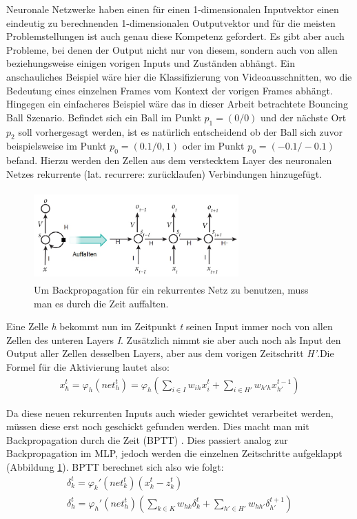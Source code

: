 Neuronale Netzwerke haben einen für einen 1-dimensionalen Inputvektor einen eindeutig zu berechnenden 1-dimensionalen Outputvektor und für die meisten Problemstellungen ist auch genau diese Kompetenz gefordert. Es gibt aber auch Probleme, bei denen der Output nicht nur von diesem, sondern auch von allen beziehungsweise einigen vorigen Inputs und Zuständen abhängt. Ein anschauliches Beispiel wäre hier die Klassifizierung von Videoausschnitten, wo die Bedeutung eines einzelnen Frames vom Kontext der vorigen Frames abhängt. Hingegen ein einfacheres Beispiel wäre das in dieser Arbeit betrachtete Bouncing Ball Szenario. Befindet sich ein Ball im Punkt \(p_{1}=(0/0)\) und der nächste Ort \(p_{2}\) soll vorhergesagt werden, ist es natürlich entscheidend ob der Ball sich zuvor beispielsweise im Punkt \(p_{0}=(0.1/0,1)\) oder im Punkt \(p_{0}=(-0.1/-0.1)\) befand. Hierzu werden den Zellen aus dem verstecktem Layer des neuronalen Netzes rekurrente (lat. recurrere: zurücklaufen) Verbindungen hinzugefügt.
\begin{figure}
	\centering
	\includegraphics[width=0.7\textwidth, height=130px]{pics/rnn.jpg}	
	\caption{Um Backpropagation für ein rekurrentes Netz zu benutzen, muss man es durch die Zeit auffalten. \cite{bib:rnn}}
	\label{img:rnn}
\end{figure}
Eine Zelle \textit{h} bekommt nun im Zeitpunkt \textit{t} seinen Input immer noch von allen Zellen des unteren Layers \textit{I}. Zusätzlich nimmt sie aber auch noch als Input den Output aller Zellen desselben Layers, aber aus dem vorigen Zeitschritt \textit{H'}.Die Formel für die Aktivierung lautet also: 
\begin{gather}
x^{t}_{h}=\varphi_{h}(net_{h}^{t})=\varphi_{h}(\sum_{i \in I}w_{ih}x^{t}_{i}+\sum_{i \in H'}w_{h'h}x^{t-1}_{h'})
\end{gather}

Da diese neuen rekurrenten Inputs auch wieder gewichtet verarbeitet werden, müssen diese erst noch geschickt gefunden werden. Dies macht man mit Backpropagation durch die Zeit (BPTT) \cite{bib:bptt}. Dies passiert analog zur Backpropagation im MLP, jedoch werden die einzelnen Zeitschritte aufgeklappt (Abbildung \ref{img:rnn}). BPTT berechnet sich also wie folgt:
\begin{gather}
	\delta_{k}^{t} = \varphi_{k}'(net_{k}^{t})(x_{k}^{t}-z^{t}_{k}) \\
	\delta_{h}^{t} = \varphi_{h}'(net_{h}^{t})(\sum_{k \in K}w_{hk}\delta^{t}_{k}+\sum_{h' \in H'}w_{hh'}\delta^{t+1}_{h'})
\end{gather}

